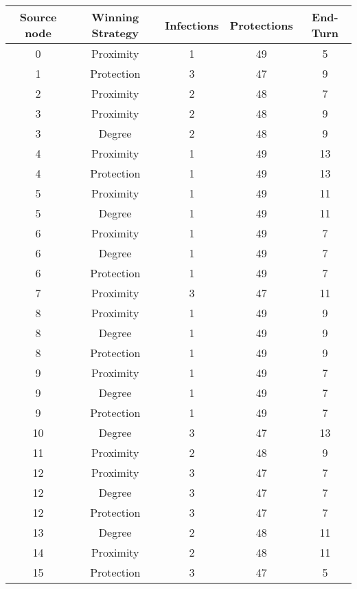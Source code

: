 \documentclass[results.tex]{subfiles}
\begin{document}
\begin{center}
  \begin{tabular}{| c || c | c | c | c |}
    \hline
    {\bfseries Source node} & {\bfseries Winning Strategy} & {\bfseries Infections} & {\bfseries Protections} & {\bfseries End-Turn} \\  %
    \hline\hline
    0 & Proximity & 1 & 49 & 5 \\ 
    \hline
    1 & Protection & 3 & 47 & 9 \\ 
    \hline
    2 & Proximity & 2 & 48 & 7 \\ 
    \hline
    3 & Proximity & 2 & 48 & 9 \\ 
    \hline
    3 & Degree & 2 & 48 & 9 \\ 
    \hline
    4 & Proximity & 1 & 49 & 13 \\ 
    \hline
    4 & Protection & 1 & 49 & 13 \\ 
    \hline
    5 & Proximity & 1 & 49 & 11 \\ 
    \hline
    5 & Degree & 1 & 49 & 11 \\ 
    \hline
    6 & Proximity & 1 & 49 & 7 \\ 
    \hline
    6 & Degree & 1 & 49 & 7 \\ 
    \hline
    6 & Protection & 1 & 49 & 7 \\ 
    \hline
    7 & Proximity & 3 & 47 & 11 \\ 
    \hline
    8 & Proximity & 1 & 49 & 9 \\ 
    \hline
    8 & Degree & 1 & 49 & 9 \\ 
    \hline
    8 & Protection & 1 & 49 & 9 \\ 
    \hline
    9 & Proximity & 1 & 49 & 7 \\ 
    \hline
    9 & Degree & 1 & 49 & 7 \\ 
    \hline
    9 & Protection & 1 & 49 & 7 \\ 
    \hline
    10 & Degree & 3 & 47 & 13 \\ 
    \hline
    11 & Proximity & 2 & 48 & 9 \\ 
    \hline
    12 & Proximity & 3 & 47 & 7 \\ 
    \hline
    12 & Degree & 3 & 47 & 7 \\ 
    \hline
    12 & Protection & 3 & 47 & 7 \\ 
    \hline
    13 & Degree & 2 & 48 & 11 \\ 
    \hline
    14 & Proximity & 2 & 48 & 11 \\ 
    \hline
    15 & Protection & 3 & 47 & 5 \\ 

\end{tabular}
\end{center}
\end{document}
